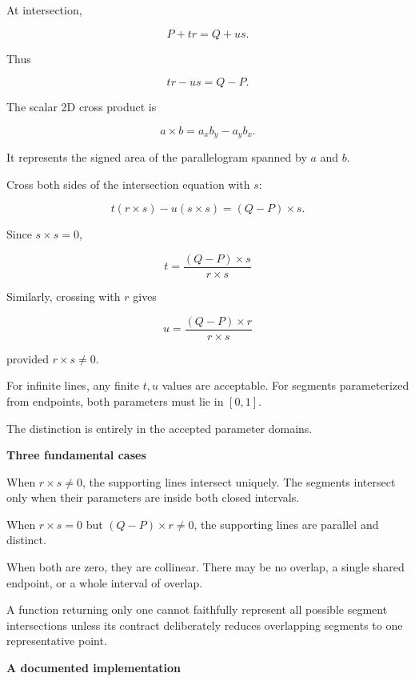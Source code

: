 At intersection,

\[
P+tr=Q+us.
\]

Thus

\[
tr-us=Q-P.
\]

The scalar 2D cross product is

\[
a\times b=a_xb_y-a_yb_x.
\]

It represents the signed area of the parallelogram spanned by \(a\) and \(b\).

Cross both sides of the intersection equation with \(s\):

\[
t(r\times s)-u(s\times s)=(Q-P)\times s.
\]

Since \(s\times s=0\),

\[
\boxed{ t=\frac{(Q-P)\times s}{r\times s} }
\]

Similarly, crossing with \(r\) gives

\[
\boxed{ u=\frac{(Q-P)\times r}{r\times s} }
\]

provided \(r\times s\ne0\).

For infinite lines, any finite \(t,u\) values are acceptable. For segments parameterized from endpoints, both parameters must lie in \([0,1]\).

The distinction is entirely in the accepted parameter domains.

\textbf{Three fundamental cases}

When \(r\times s\ne0\), the supporting lines intersect uniquely. The segments intersect only when their parameters are inside both closed intervals.

When \(r\times s=0\) but \((Q-P)\times r\ne0\), the supporting lines are parallel and distinct.

When both are zero, they are collinear. There may be no overlap, a single shared endpoint, or a whole interval of overlap.

A function returning only one  cannot faithfully represent all possible segment intersections unless its contract deliberately reduces overlapping segments to one representative point.

\textbf{A documented implementation}


